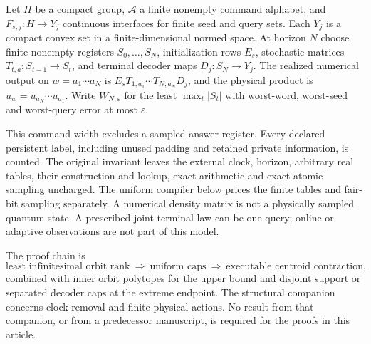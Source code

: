 \begin{definition}\label{def:machine54}
Let $H$ be a compact group, $\mathcal A$ a finite nonempty command
alphabet, and $F_{s,j}:H\to Y_j$ continuous interfaces for finite seed
and query sets. Each $Y_j$ is a compact convex set in a finite-dimensional
normed space. At horizon $N$ choose finite nonempty registers
$S_0,\ldots,S_N$, initialization rows $E_s$, stochastic matrices
$T_{t,a}:S_{t-1}\to S_t$, and terminal decoder maps $D_j:S_N\to Y_j$.
The realized numerical output on $w=a_1\cdots a_N$ is
$E_sT_{1,a_1}\cdots T_{N,a_N}D_j$, and the physical product is
$u_w=u_{a_N}\cdots u_{a_1}$. Write $W_{N,\varepsilon}$ for the least
$\max_t|S_t|$ with worst-word, worst-seed and worst-query error at most
$\varepsilon$.
\end{definition}
This command width excludes a sampled answer register. Every declared
persistent label, including unused padding and retained private
information, is counted. The original invariant leaves the external
clock, horizon, arbitrary real tables, their construction and lookup,
exact arithmetic and exact atomic sampling uncharged. The uniform
compiler below prices the finite tables and fair-bit sampling separately.
A numerical density matrix is not a physically sampled quantum state.
A prescribed joint terminal law can be one query; online or adaptive
observations are not part of this model.

The proof chain is
\[
 \text{least infinitesimal orbit rank}
 \ \Longrightarrow\ \text{uniform caps}
 \ \Longrightarrow\ \text{executable centroid contraction},
\]
combined with inner orbit polytopes for the upper bound and disjoint
support or separated decoder caps at the extreme endpoint. The structural
companion concerns clock removal and finite physical actions. No result
from that companion, or from a predecessor manuscript, is required for
the proofs in this article.
